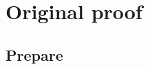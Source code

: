 \documentclass[11pt]{amsart}
\numberwithin{equation}{section}
\newtheorem{lem}[defn]{Lemma}
\newtheorem{thm}[defn]{Theorem}
\begin{document}

\section{Original proof}
\subsection{Prepare}
\end{document}
